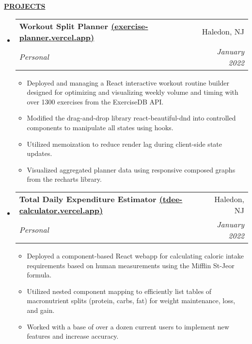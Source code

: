 \documentclass[letterpaper,11pt]{article}
\makeatletter
\newcommand{\resheading}[1]{{{\begin{minipage}{\textwidth}{\textbf{#1 \vphantom{p\^{E}}}}\end{minipage}}}}
\newcommand{\ressubheading}[4]{
\begin{tabular*}{7.3in}{l@{\extracolsep{\fill}}r}
		\textbf{#1} & #2 \\
		\textit{#3} & \textit{#4} \\
\end{tabular*}}
\makeatother
\begin{document}
\resheading{\hspace{0em}\uline{\textsc{PROJECTS}\hfill}}
\vspace{-0.25in}

\begin{itemize}[leftmargin=*]
\item
	\ressubheading{Workout Split Planner \href{https://exercise-planner.vercel.app}{(exercise-planner.vercel.app)}}{Haledon, NJ}{Personal}{January 2022}
	\vspace{-0.1in}
	\begin{itemize}[leftmargin=*]
	\setlength\itemsep{0em}
		\item{Deployed and managing a React interactive workout routine builder designed for optimizing and visualizing weekly volume and timing with over 1300 exercises from the  ExerciseDB API.}
		\item{Modified the drag-and-drop library react-beautiful-dnd into controlled components to manipulate all states using hooks.}
		\item{Utilized memoization to reduce render lag during client-side state updates.}
		\item{Visualized aggregated planner data using responsive composed graphs from the recharts library.}
	\end{itemize}
	
\item
	\ressubheading{Total Daily Expenditure Estimator \href{https://tdee-calculator.vercel.app}{(tdee-calculator.vercel.app)}}{Haledon, NJ}{Personal}{January 2022}
	\vspace{-0.1in}
	\begin{itemize}[leftmargin=*]
	\setlength\itemsep{0em}
		\item{Deployed a component-based React webapp for calculating caloric intake requirements based on human measurements using the Mifflin St-Jeor formula.}
		\item{Utilized nested component mapping to efficiently list tables of macronutrient  splits (protein, carbs, fat) for weight maintenance, loss, and gain.}
		\item{Worked with a base of over a dozen current users to implement new features and increase accuracy.}
	\end{itemize}
	

\end{itemize}
\end{document}
